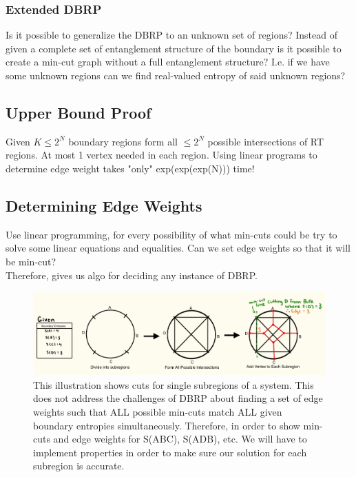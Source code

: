 \documentclass[12pt]{article}
\begin{document}
\subsubsection{Extended DBRP}
\hspace{0.5cm} Is it possible to generalize the DBRP to an unknown set of regions? Instead of given a complete set of entanglement structure of the boundary is it possible to create a min-cut graph without a full entanglement structure? I.e. if we have some unknown regions can we find real-valued entropy of said unknown regions?


\subsection{Upper Bound Proof}
Given $K\leq2^N$ boundary regions form all $\leq2^N$ possible intersections of RT regions. At most 1 vertex needed in each region. Using linear programs to determine edge weight takes "only" exp(exp(exp(N))) time!

\subsection{Determining Edge Weights}
Use linear programming, for every possibility of what min-cuts could be try to solve some linear equations and equalities. Can we set edge weights so that it will be min-cut?
\\Therefore, gives us algo for deciding any instance of DBRP.

\begin{figure}[htbp]  %
    \centering
    \includegraphics[width=\textwidth]{vertex_subregions.jpeg}  %
    \caption{This illustration shows cuts for single subregions of a system. This does not address the challenges of DBRP about finding a set of edge weights such that ALL possible min-cuts match ALL given boundary entropies simultaneously. Therefore, in order to show min-cuts and edge weights for S(ABC), S(ADB), etc. We will have to implement properties in order to make sure our solution for each subregion is accurate.}  %
    \label{fig:single subregion min-cut}  %
\end{figure}
\newpage 
\end{document}
